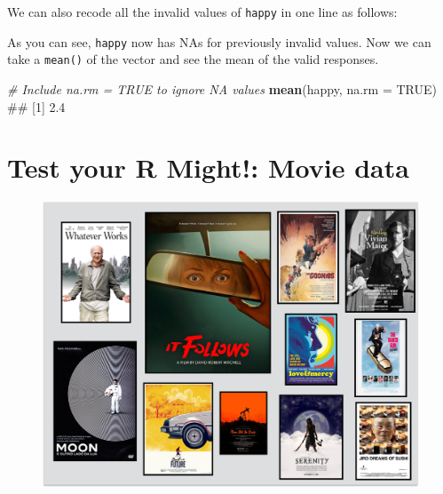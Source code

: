 \documentclass[]{book}
\newenvironment{Shaded}{\begin{snugshade}}{\end{snugshade}}
\newcommand{\KeywordTok}[1]{\textcolor[rgb]{0.13,0.29,0.53}{\textbf{#1}}}
\newcommand{\DataTypeTok}[1]{\textcolor[rgb]{0.13,0.29,0.53}{#1}}
\newcommand{\DecValTok}[1]{\textcolor[rgb]{0.00,0.00,0.81}{#1}}
\newcommand{\StringTok}[1]{\textcolor[rgb]{0.31,0.60,0.02}{#1}}
\newcommand{\CommentTok}[1]{\textcolor[rgb]{0.56,0.35,0.01}{\textit{#1}}}
\newcommand{\OtherTok}[1]{\textcolor[rgb]{0.56,0.35,0.01}{#1}}
\newcommand{\OperatorTok}[1]{\textcolor[rgb]{0.81,0.36,0.00}{\textbf{#1}}}
\newcommand{\NormalTok}[1]{#1}
\theoremstyle{definition}
\theoremstyle{definition}
\theoremstyle{remark}
\begin{document}
We can also recode all the invalid values of \texttt{happy} in one line
as follows:

\begin{Shaded}
\end{Shaded}

As you can see, \texttt{happy} now has NAs for previously invalid
values. Now we can take a \texttt{mean()} of the vector and see the mean
of the valid responses.

\begin{Shaded}
\begin{Highlighting}[]
\CommentTok{# Include na.rm = TRUE to ignore NA values}
\KeywordTok{mean}\NormalTok{(happy, }\DataTypeTok{na.rm =} \OtherTok{TRUE}\NormalTok{)}
\NormalTok{## [1] 2.4}
\end{Highlighting}
\end{Shaded}

\section{Test your R Might!: Movie
data}\label{test-your-r-might-movie-data}

\begin{figure}

{\centering \includegraphics[width=1\linewidth]{images/moviecollage} 

}

\end{figure}
\end{document}
